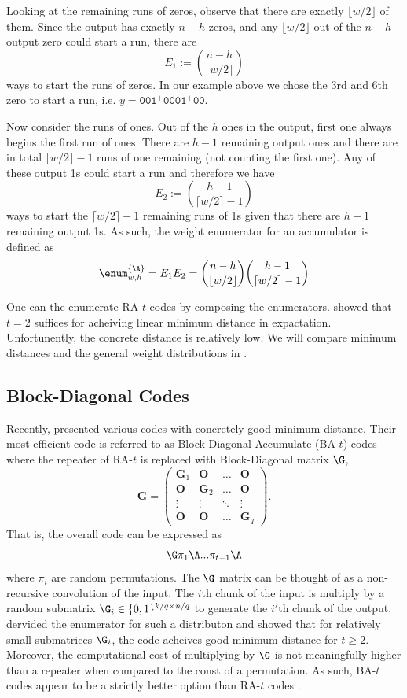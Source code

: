 Looking at the remaining runs of zeros, observe that there are exactly $\lfloor w/2\rfloor$ of them. Since the output has exactly $n-h$ zeros, and any $\lfloor w/2\rfloor$ out of the $n-h$ output zero could start a run, there are
$$
E_1:={n-h\choose \lfloor w/2\rfloor}
$$
ways to start the runs of zeros. In our example above we chose the 3rd and 6th zero to start a run, i.e.
$
y=\mathtt{001^+0001^+00}.
$

Now consider the runs of ones. Out of the $h$ ones in the output, first one always begins the first run of ones. There are $h-1$ remaining output ones and there are in total $\lceil w/2\rceil-1$ runs of one remaining (not counting the first one). Any of these output 1s could start a run and therefore we have
$$
E_2:={h-1\choose \lceil w/2\rceil -1}
$$
ways to start the $\lceil w/2\rceil -1$ remaining runs of 1s given that there are $h-1$ remaining output 1s. As such, the weight enumerator for an accumulator is defined as
$$
\enum^{\{\A\}}_{w,h}=E_1E_2={n-h\choose \lfloor w/2\rfloor}{h-1\choose \lceil w/2\rceil -1}
$$

One can the enumerate RA-$t$ codes by composing the enumerators.
\cite{spielman} showed that $t=2$ suffices for acheiving linear minimum distance in expactation. Unfortunently, the concrete distance is relatively low. We will compare minimum distances and the general weight distributions in .

\subsection{Block-Diagonal Codes}

Recently, \cite{parallelPCG} presented various codes with concretely good minimum distance. Their most efficient code is referred to as Block-Diagonal Accumulate (BA-$t$) codes where the repeater of RA-$t$ is replaced with Block-Diagonal matrix $\G$,
$$
\mathbf{G} = \left(
  \begin{matrix}\mathbf{G}_1 & \mathbf{O} &\ldots&\mathbf{O}\\\mathbf{O} &\mathbf{G}_2 & \ldots&\mathbf{O}\\\vdots & \vdots &\ddots&\vdots\\\mathbf{O} & \mathbf{O} &\ldots&\mathbf{G}_{q}
\end{matrix}\right).
$$
That is, the overall code can be expressed as
$$
\G\pi_1\A...\pi_{t-1}\A
$$
where $\pi_i$ are random permutations.
The $\G$ matrix can be thought of as a non-recursive convolution of the input. The $i$th chunk of the input is multiply by a random submatrix $\G_i\in \{0,1\}^{k/q\times n/q}$ to generate the $i'$th chunk of the output.  \cite{parallelPCG} dervided the enumerator for such a distributon and showed that for relatively small submatrices $\G_i$, the code acheives good minimum distance for $t\geq 2$. Moreover, the computational cost of multiplying by $\G$ is not meaningfully higher than a repeater when compared to the const of a permutation. As such, BA-$t$ codes appear to be a strictly better option than RA-$t$ codes \cite{spielman,RAA}.

